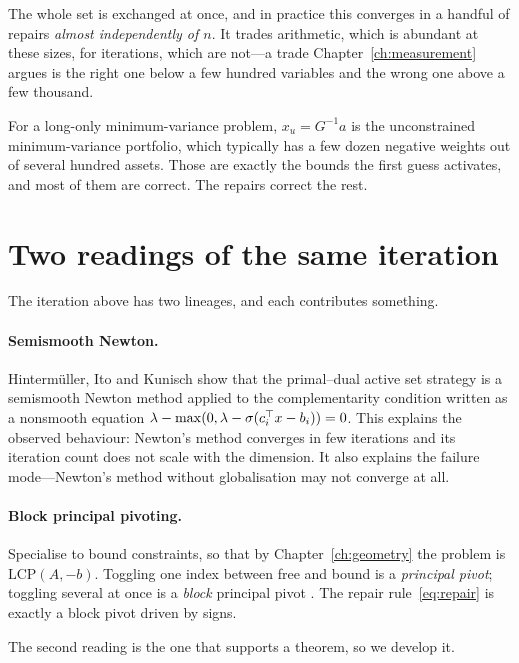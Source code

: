The whole set is exchanged at once, and in practice this converges in a handful of
repairs \emph{almost independently of $n$}. It trades arithmetic, which is abundant
at these sizes, for iterations, which are not---a trade Chapter~\ref{ch:measurement}
argues is the right one below a few hundred variables and the wrong one above a few
thousand.

\begin{example}
For a long-only minimum-variance problem, $x_u = G^{-1}a$ is the unconstrained
minimum-variance portfolio, which typically has a few dozen negative weights out of
several hundred assets. Those are exactly the bounds the first guess activates,
and most of them are correct. The repairs correct the rest.
\end{example}

\section{Two readings of the same iteration}

The iteration above has two lineages, and each contributes something.

\paragraph{Semismooth Newton.} Hintermüller, Ito and Kunisch \cite{hintermuller2002}
show that the primal--dual active set strategy is a semismooth Newton method applied
to the complementarity condition written as a nonsmooth equation
$\lambda - \max(0, \lambda - \sigma(c_i^{\top} x - b_i)) = 0$. This explains the observed
behaviour: Newton's method converges in few iterations and its iteration count does
not scale with the dimension. It also explains the failure mode---Newton's method
without globalisation may not converge at all.

\paragraph{Block principal pivoting.} Specialise to bound constraints, so that by
Chapter~\ref{ch:geometry} the problem is $\mathrm{LCP}(A,-b)$. Toggling one index
between free and bound is a \emph{principal pivot}; toggling several at once is a
\emph{block} principal pivot \cite{judice1994,kim2011}. The repair
rule~\eqref{eq:repair} is exactly a block pivot driven by signs.

The second reading is the one that supports a theorem, so we develop it.

